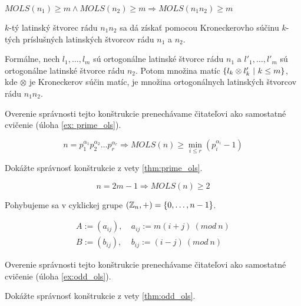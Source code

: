 \begin{theorem}
\label{thm:prime_ols}
$MOLS(n_1) \geq m \wedge MOLS(n_2) \geq m \Rightarrow MOLS(n_1 n_2) \geq m$
\end{theorem}

\begin{construction}
$k$-tý latinský štvorec rádu $n_1 n_2$ sa dá získať pomocou Kroneckerovho súčinu $k$-tých príslušných latinských štvorcov rádu $n_1$ a $n_2$.

Formálne, nech $l_1, \ldots, l_m$ sú ortogonálne latinské štvorce rádu $n_1$ a $l'_1, \ldots, l'_m$ sú ortogonálne latinské štvorce rádu $n_2$.
Potom množina matíc $\left\{l_k \otimes l'_k ~|~ k \leq m\right\}$, kde $\otimes$ je Kroneckerov súčin matíc, je množina ortogonálnych latinských štvorcov rádu $n_1 n_2$.

Overenie správnosti tejto konštrukcie prenechávame čitateľovi ako samostatné cvičenie (úloha \ref{ex: prime_ols}).
\end{construction}

\begin{corollary}
$$n = p_1^{\alpha_1} p_2^{\alpha_2} \ldots p_r^{\alpha_r} \Rightarrow MOLS(n) \geq \min_{i \leq r} (p_i^{\alpha_i} - 1)$$
\end{corollary}


\begin{exercise}
\label{ex: prime_ols}
Dokážte správnosť konštrukcie z vety \ref{thm:prime_ols}.
\end{exercise}


\begin{theorem}
\label{thm:odd_ols}
$$n = 2m - 1 \Rightarrow MOLS(n) \geq 2$$
\end{theorem}

\begin{construction}

Pohybujeme sa v cyklickej grupe $(\mathbb{Z}_n, +) = \left\{0, \ldots, n-1\right\}$.

\begin{align*}
A := (a_{ij}),~& a_{ij} := m (i+j)~(mod~n) \\
B := (b_{ij}),~& b_{ij} := (i-j)  ~(mod~n)    
\end{align*}

Overenie správnosti tejto konštrukcie prenechávame čitateľovi ako samostatné cvičenie (úloha \ref{ex:odd_ols}).
\end{construction}


\begin{exercise}
\label{ex:odd_ols}
Dokážte správnosť konštrukcie z vety \ref{thm:odd_ols}.
\end{exercise}


